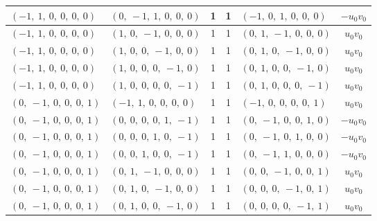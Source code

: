 \documentclass[11pt]{article}
\theoremstyle{definition}
\begin{document}
\begin{longtable}{|l|l|c|c|l|c|}
    \hline
    $\left( -1, \  1, \  0, \  0, \  0, \  0\right)$ & $\left( 0, \  -1, \  1, \  0, \  0, \  0\right)$ & 1 & 1 & $\left( -1, \  0, \  1, \  0, \  0, \  0\right)$ & $- u_{0} v_{0}$ \\
    \hline
    $\left( -1, \  1, \  0, \  0, \  0, \  0\right)$ & $\left( 1, \  0, \  -1, \  0, \  0, \  0\right)$ & 1 & 1 & $\left( 0, \  1, \  -1, \  0, \  0, \  0\right)$ & $u_{0} v_{0}$ \\
    \hline
    $\left( -1, \  1, \  0, \  0, \  0, \  0\right)$ & $\left( 1, \  0, \  0, \  -1, \  0, \  0\right)$ & 1 & 1 & $\left( 0, \  1, \  0, \  -1, \  0, \  0\right)$ & $u_{0} v_{0}$ \\
    \hline
    $\left( -1, \  1, \  0, \  0, \  0, \  0\right)$ & $\left( 1, \  0, \  0, \  0, \  -1, \  0\right)$ & 1 & 1 & $\left( 0, \  1, \  0, \  0, \  -1, \  0\right)$ & $u_{0} v_{0}$ \\
    \hline
    $\left( -1, \  1, \  0, \  0, \  0, \  0\right)$ & $\left( 1, \  0, \  0, \  0, \  0, \  -1\right)$ & 1 & 1 & $\left( 0, \  1, \  0, \  0, \  0, \  -1\right)$ & $u_{0} v_{0}$ \\
    \hline
    $\left( 0, \  -1, \  0, \  0, \  0, \  1\right)$ & $\left( -1, \  1, \  0, \  0, \  0, \  0\right)$ & 1 & 1 & $\left( -1, \  0, \  0, \  0, \  0, \  1\right)$ & $u_{0} v_{0}$ \\
    \hline
    $\left( 0, \  -1, \  0, \  0, \  0, \  1\right)$ & $\left( 0, \  0, \  0, \  0, \  1, \  -1\right)$ & 1 & 1 & $\left( 0, \  -1, \  0, \  0, \  1, \  0\right)$ & $- u_{0} v_{0}$ \\
    \hline
    $\left( 0, \  -1, \  0, \  0, \  0, \  1\right)$ & $\left( 0, \  0, \  0, \  1, \  0, \  -1\right)$ & 1 & 1 & $\left( 0, \  -1, \  0, \  1, \  0, \  0\right)$ & $- u_{0} v_{0}$ \\
    \hline
    $\left( 0, \  -1, \  0, \  0, \  0, \  1\right)$ & $\left( 0, \  0, \  1, \  0, \  0, \  -1\right)$ & 1 & 1 & $\left( 0, \  -1, \  1, \  0, \  0, \  0\right)$ & $- u_{0} v_{0}$ \\
    \hline
    $\left( 0, \  -1, \  0, \  0, \  0, \  1\right)$ & $\left( 0, \  1, \  -1, \  0, \  0, \  0\right)$ & 1 & 1 & $\left( 0, \  0, \  -1, \  0, \  0, \  1\right)$ & $u_{0} v_{0}$ \\
    \hline
    $\left( 0, \  -1, \  0, \  0, \  0, \  1\right)$ & $\left( 0, \  1, \  0, \  -1, \  0, \  0\right)$ & 1 & 1 & $\left( 0, \  0, \  0, \  -1, \  0, \  1\right)$ & $u_{0} v_{0}$ \\
    \hline
    $\left( 0, \  -1, \  0, \  0, \  0, \  1\right)$ & $\left( 0, \  1, \  0, \  0, \  -1, \  0\right)$ & 1 & 1 & $\left( 0, \  0, \  0, \  0, \  -1, \  1\right)$ & $u_{0} v_{0}$ \\

\end{longtable}
\end{document}
